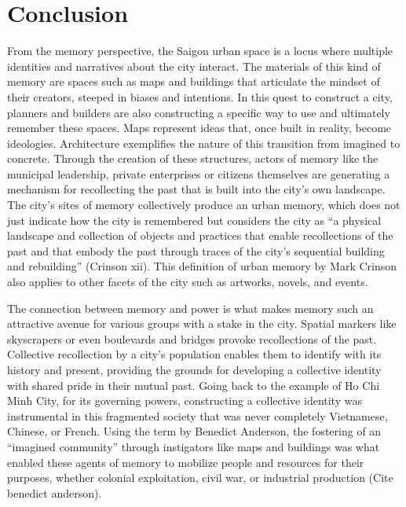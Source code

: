 \chapter{Conclusion}\label{conclusion}

\vi From the memory perspective, the Saigon urban space is a locus where multiple identities and narratives about the city interact. The materials of this kind of memory are spaces such as maps and buildings that articulate the mindset of their creators, steeped in biases and intentions. In this quest to construct a city, planners and builders are also constructing a specific way to use and ultimately remember these spaces. Maps represent ideas that, once built in reality, become ideologies. Architecture exemplifies the nature of this transition from imagined to concrete. Through the creation of these structures, actors of memory like the municipal leadership, private enterprises or citizens themselves are generating a mechanism for recollecting the past that is built into the city’s own landscape. The city’s sites of memory collectively produce an urban memory, which does not just indicate how the city is remembered but considers the city as “a physical landscape and collection of objects and practices that enable recollections of the past and that embody the past through traces of the city’s sequential building and rebuilding” (Crinson xii). This definition of urban memory by Mark Crinson also applies to other facets of the city such as artworks, novels, and events.

The connection between memory and power is what makes memory such an attractive avenue for various groups with a stake in the city. Spatial markers like skyscrapers or even boulevards and bridges provoke recollections of the past. Collective recollection by a city’s population enables them to identify with its history and present, providing the grounds for developing a collective identity with shared pride in their mutual past. Going back to the example of Ho Chi Minh City, for its governing powers, constructing a collective identity was instrumental in this fragmented society that was never completely Vietnamese, Chinese, or French. Using the term by Benedict Anderson, the fostering of an “imagined community” through instigators like maps and buildings was what enabled these agents of memory to mobilize people and resources for their purposes, whether colonial exploitation, civil war, or industrial production (Cite benedict anderson). 

